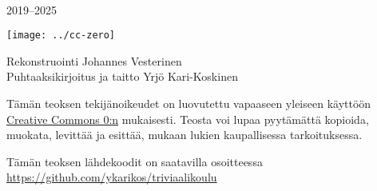 \newpage
~\vfill
\thispagestyle{empty}
\setlength{\parindent}{0pt}
\setlength{\parskip}{\baselineskip}

2019–2025

\texttt{[image: ../cc-zero]}

Rekonstruointi Johannes Vesterinen \\
Puhtaaksikirjoitus ja taitto Yrjö Kari-Koskinen

Tämän teoksen tekijänoikeudet on luovutettu vapaaseen yleiseen käyttöön  \href{https://creativecommons.org/publicdomain/zero/1.0/deed.fi}{Creative Commons 0:n} mukaisesti. Teosta voi lupaa pyytämättä kopioida, muokata, levittää ja esittää, mukaan lukien kaupallisessa tarkoituksessa.

Tämän teoksen lähdekoodit on saatavilla osoitteessa \url{https://github.com/ykarikos/triviaalikoulu}


